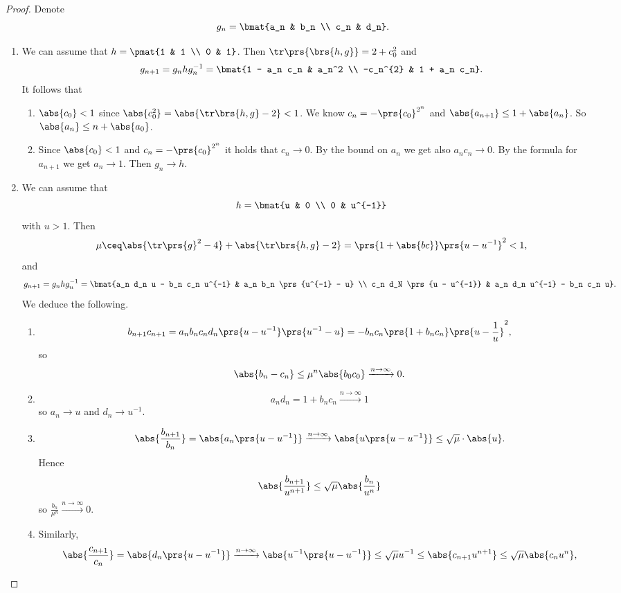 \documentclass[10pt, twoside]{book}
\begin{document}
\begin{proof}
Denote
\[g_n = \bmat{a_n & b_n \\ c_n & d_n} \text{.}\]
\begin{enumerate}
\item%
We can assume that $h = \pmat{1 & 1 \\ 0 & 1}$. Then $\tr\prs{\brs{h,g}} = 2 + c_0^2$ and
\[g_{n+1} = g_n h g_n^{-1} = \bmat{1 - a_n c_n & a_n^2 \\ -c_n^{2} & 1 + a_n c_n} \text{.}\]
It follows that
\begin{enumerate}
\item $\abs{c_0} < 1$ since $\abs{c_0^2} = \abs{\tr\brs{h,g} - 2} < 1$.
We know $c_n = -\prs{c_0}^{2^n}$ and $\abs{a_{n+1}} \leq 1 + \abs{a_n}$. So $\abs{a_n} \leq n + \abs{a_0}$.
\item Since $\abs{c_0} < 1$ and $c_n = -\prs{c_0}^{2^n}$ it holds that $c_n \to 0$. By the bound on $a_n$ we get also $a_n c_n \to 0$. By the formula for $a_{n+1}$ we get $a_n \to 1$. Then $g_n \to h$.
\end{enumerate}
\item%
We can assume that
\[h = \bmat{u & 0 \\ 0 & u^{-1}}\]
with $u > 1$. Then
\[\mu \ceq \abs{\tr\prs{g}^2 - 4} + \abs{\tr\brs{h,g} - 2} = \prs{1+\abs{bc}}\prs{u - u^{-1}}^2 < 1 \text{,}\]
and
\[g_{n+1} = g_n h g_n^{-1} = \bmat{a_n d_n u - b_n c_n u^{-1} & a_n b_n \prs{u^{-1} - u} \\ c_n d_N \prs{u - u^{-1}} & a_n d_n u^{-1} - b_n c_n u} \text{.}\]
We deduce the following.
\begin{enumerate}
\item
\[b_{n+1} c_{n+1} = a_n b_n c_n d_n \prs{u - u^{-1}} \prs{u^{-1} - u} = -b_n c_n \prs{1 + b_n c_n} \prs{u - \frac{1}{u}}^2 \text{,}\]
so \[\abs{b_n - c_n} \leq \mu^n \abs{b_0 c_0} \xrightarrow{n\to\infty} 0\text{.}\]
\item \[a_n d_n = 1 + b_n c_n \xrightarrow{n\to\infty} 1\]
so
$a_n \to u$ and $d_n \to u^{-1}$.
\item \[\abs{\frac{b_{n+1}}{b_n}} = \abs{a_n \prs{u - u^{-1}}} \xrightarrow{n\to\infty} \abs{u \prs{u-u^{-1}}} \leq \sqrt{\mu} \cdot \abs{u} \text{.}\]
Hence
\[\abs{\frac{b_{n+1}}{u^{n+1}}} \leq \sqrt{\mu} \abs{\frac{b_n}{u^n}}\]
so
$\frac{b_n}{\mu^n} \xrightarrow{n\to\infty} 0$.
\item Similarly, \[\abs{\frac{c_{n+1}}{c_n}} = \abs{d_n \prs{u - u^{-1}}} \xrightarrow{n\to\infty} \abs{u^{-1}\prs{u - u^{-1}}} \leq \sqrt{\mu} u^{-1} \leq \abs{c_{n+1} u^{n+1}} \leq \sqrt{\mu} \abs{c_n u^n} \text{,}\]

\end{enumerate}
\end{enumerate}
\end{proof}
\end{document}
